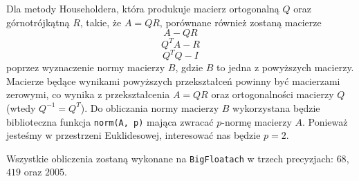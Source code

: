 Dla metody Householdera, która produkuje macierz ortogonalną $Q$ oraz górnotrójkątną $R$, takie, że $A=QR$, porównane również zostaną macierze
$$A-QR$$
$$Q^TA-R$$
$$Q^TQ-I$$
poprzez wyznaczenie normy macierzy $B$, gdzie $B$ to jedna z powyższych macierzy. Macierze będące wynikami powyższych przekształceń powinny być macierzami zerowymi, co wynika z przekształcenia $A=QR$ oraz ortogonalności macierzy $Q$ (wtedy $Q^{-1}=Q^T$). Do obliczania normy macierzy $B$ wykorzystana będzie biblioteczna funkcja \verb+norm(A, p)+ mająca zwracać $p$-normę macierzy $A$. Ponieważ jesteśmy w przestrzeni Euklidesowej, interesować nas będzie $p=2$. 

Wszystkie obliczenia zostaną wykonane na \verb+BigFloatach+ w trzech precyzjach: $68$, $419$ oraz $2005$.